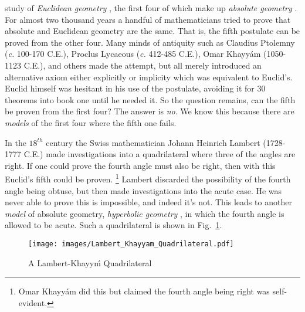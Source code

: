         study of \textit{Euclidean geometry}%
        , the first four of which make up
        \textit{absolute geometry}%
        . For almost two thousand years a handful of
        mathematicians tried to prove that absolute and Euclidean geometry are
        the same. That is, the fifth postulate can be proved from
        the other four. Many minds of antiquity such as Claudius Ptolemny%
         (\textit{c.} 100-170 C.E.), Proclus
        Lycaeous (\textit{c.} 412-485 C.E.), Omar
        Khayy\'{a}m (1050-1123 C.E.), and others
        made the attempt, but all merely introduced an alternative axiom either
        explicitly or implicity which was equivalent to Euclid's. Euclid himself
        was hesitant in his use of the postulate, avoiding it for 30 theorems
        into book one until he needed it. So the question remains, can the fifth
        be proven from the first four? The answer is \textit{no}. We know this
        because there are \textit{models} of the first four where
        the fifth one fails.
        \par\hfill\par
        In the $18^{th}$ century the Swiss mathematician Johann Heinrich
        Lambert (1728-1777 C.E.) made
        investigations into a quadrilateral where three of the angles are right.
        If one could prove the fourth angle must also be right, then with this
        Euclid's fifth could be proven.%
        \footnote{%
            Omar Khayy\'{a}m did this but claimed the fourth angle
            being right was self-evident.
        }
        Lambert discarded the possibility of the fourth angle being obtuse, but
        then made investigations into the acute case. He was never able to prove
        this is impossible, and indeed it's not. This leads to another
        \textit{model} of absolute geometry, \textit{hyperbolic geometry}%
        , in which the fourth angle is allowed to be
        acute. Such a quadrilateral is shown in
        Fig.~\ref{fig:Lambert_Khayyam_Quadrilateral}.
        \begin{figure}[H]
            \centering
            \captionsetup{type=figure}
            \if{}
                \texttt{[image: images/Lambert\_Khayyam\_Quadrilateral.pdf]}
            \fi
            \caption{A Lambert-Khayy\'{m} Quadrilateral}
            \label{fig:Lambert_Khayyam_Quadrilateral}
        \end{figure}
